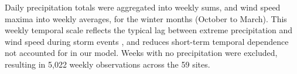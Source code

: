\documentclass[
  12pt]{article}
\begin{document}
Daily precipitation totals were aggregated into weekly sums, and wind speed maxima into weekly averages, for the winter months (October to March). 
This weekly temporal scale reflects the typical lag between extreme precipitation and wind speed during storm events \citep{Bengtsson2009}, and reduces short-term temporal dependence not accounted for in our model. 
Weeks with no precipitation were excluded, resulting in 5,022 weekly observations across the 59 sites. 

\end{document}
